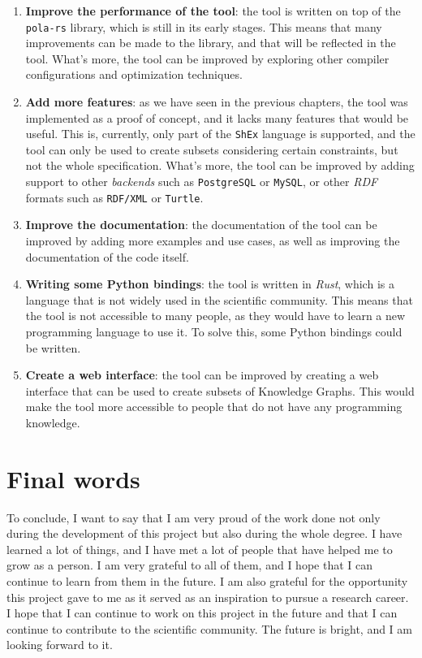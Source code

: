 \begin{enumerate}
    \itemsep0.5em
    \item \textbf{Improve the performance of the tool}: the tool is written on top of the \texttt{pola-rs} library, which is still in its early stages. This means that many improvements can be made to the library, and that will be reflected in the tool. What's more, the tool can be improved by exploring other compiler configurations and optimization techniques.
    \item \textbf{Add more features}: as we have seen in the previous chapters, the tool was implemented as a proof of concept, and it lacks many features that would be useful. This is, currently, only part of the \texttt{ShEx} language is supported, and the tool can only be used to create subsets considering certain constraints, but not the whole specification. What's more, the tool can be improved by adding support to other \textit{backends} such as \texttt{PostgreSQL} or \texttt{MySQL}, or other \textit{RDF} formats such as \texttt{RDF/XML} or \texttt{Turtle}.
    \item \textbf{Improve the documentation}: the documentation of the tool can be improved by adding more examples and use cases, as well as improving the documentation of the code itself.
    \item \textbf{Writing some Python bindings}: the tool is written in \textit{Rust}, which is a language that is not widely used in the scientific community. This means that the tool is not accessible to many people, as they would have to learn a new programming language to use it. To solve this, some Python bindings could be written.
    \item \textbf{Create a web interface}: the tool can be improved by creating a web interface that can be used to create subsets of Knowledge Graphs. This would make the tool more accessible to people that do not have any programming knowledge.
\end{enumerate}

\section{Final words}

To conclude, I want to say that I am very proud of the work done not only during the development of this project but also during the whole degree. I have learned a lot of things, and I have met a lot of people that have helped me to grow as a person. I am very grateful to all of them, and I hope that I can continue to learn from them in the future. I am also grateful for the opportunity this project gave to me as it served as an inspiration to pursue a research career. I hope that I can continue to work on this project in the future and that I can continue to contribute to the scientific community. The future is bright, and I am looking forward to it.